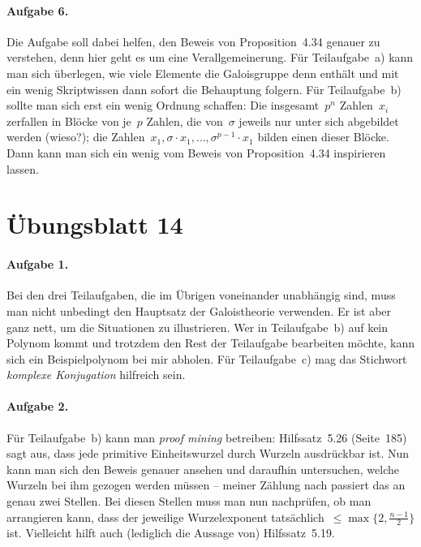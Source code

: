 \documentclass{../algblatt}
\begin{document}
\paragraph{Aufgabe 6.} Die Aufgabe soll dabei helfen, den Beweis von Proposition~4.34
genauer zu verstehen, denn hier geht es um eine Verallgemeinerung. Für
Teilaufgabe~a) kann man sich überlegen, wie viele Elemente die Galoisgruppe
denn enthält und mit ein wenig Skriptwissen dann sofort die Behauptung folgern.
Für Teilaufgabe~b) sollte man sich erst ein wenig Ordnung schaffen: Die
insgesamt~$p^n$ Zahlen~$x_i$ zerfallen in Blöcke von je~$p$ Zahlen, die
von~$\sigma$ jeweils nur unter sich abgebildet werden (wieso?); die
Zahlen~$x_1, \sigma \cdot x_1, \ldots, \sigma^{p-1} \cdot x_1$ bilden einen
dieser Blöcke. Dann kann man sich ein wenig vom Beweis von Proposition~4.34
inspirieren lassen.



\section*{Übungsblatt 14}

\paragraph{Aufgabe 1.} Bei den drei Teilaufgaben, die im Übrigen voneinander
unabhängig sind, muss man nicht unbedingt den Hauptsatz der Galoistheorie
verwenden. Er ist aber ganz nett, um die Situationen zu illustrieren. Wer in
Teilaufgabe~b) auf kein Polynom kommt und trotzdem den Rest der Teilaufgabe
bearbeiten möchte, kann sich ein Beispielpolynom bei mir abholen. Für
Teilaufgabe~c) mag das Stichwort \emph{komplexe Konjugation} hilfreich sein.

\paragraph{Aufgabe 2.} Für Teilaufgabe~b) kann man \emph{proof mining}
betreiben: Hilfssatz~5.26 (Seite~185) sagt aus, dass jede primitive
Einheitswurzel durch Wurzeln ausdrückbar ist. Nun kann man sich den Beweis
genauer ansehen und daraufhin untersuchen, welche Wurzeln bei ihm gezogen
werden müssen -- meiner Zählung nach passiert das an genau zwei Stellen. Bei
diesen Stellen muss man nun nachprüfen, ob man arrangieren kann, dass der
jeweilige Wurzelexponent tatsächlich~$\leq \max\{ 2, \frac{n-1}{2} \}$ ist.
Vielleicht hilft auch (lediglich die Aussage von) Hilfssatz~5.19.
\end{document}
